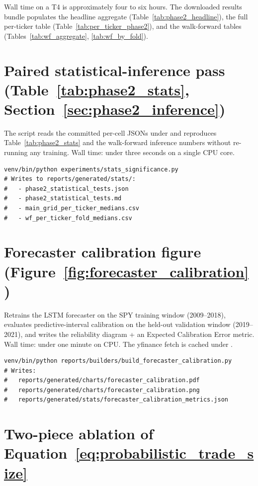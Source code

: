 Wall time on a T4 is approximately four to six hours. The downloaded results bundle populates the headline aggregate (Table~\ref{tab:phase2_headline}), the full per-ticker table (Table~\ref{tab:per_ticker_phase2}), and the walk-forward tables (Tables~\ref{tab:wf_aggregate}, \ref{tab:wf_by_fold}).

\section{Paired statistical-inference pass (Table~\ref{tab:phase2_stats}, Section~\ref{sec:phase2_inference})}
\label{app:stats_significance}

The script reads the committed per-cell JSONs under  and reproduces Table~\ref{tab:phase2_stats} and the walk-forward inference numbers without re-running any training. Wall time: under three seconds on a single CPU core.

\begin{verbatim}
venv/bin/python experiments/stats_significance.py
# Writes to reports/generated/stats/:
#   - phase2_statistical_tests.json
#   - phase2_statistical_tests.md
#   - main_grid_per_ticker_medians.csv
#   - wf_per_ticker_fold_medians.csv
\end{verbatim}

\section{Forecaster calibration figure (Figure~\ref{fig:forecaster_calibration})}
\label{app:calibration}

Retrains the LSTM forecaster on the SPY training window (2009--2018), evaluates predictive-interval calibration on the held-out validation window (2019--2021), and writes the reliability diagram + an Expected Calibration Error metric. Wall time: under one minute on CPU. The yfinance fetch is cached under .

\begin{verbatim}
venv/bin/python reports/builders/build_forecaster_calibration.py
# Writes:
#   reports/generated/charts/forecaster_calibration.pdf
#   reports/generated/charts/forecaster_calibration.png
#   reports/generated/stats/forecaster_calibration_metrics.json
\end{verbatim}

\section{Two-piece ablation of Equation~\ref{eq:probabilistic_trade_size}}
\label{app:ablation}

